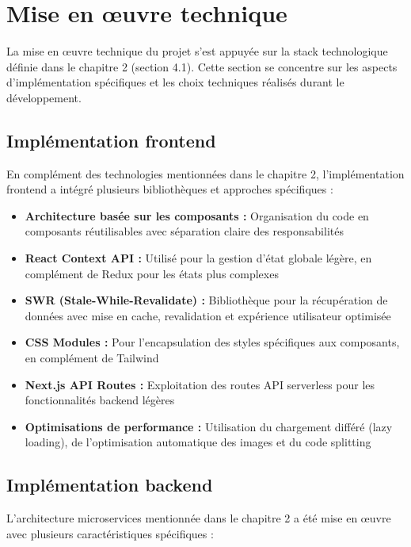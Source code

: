 \section{Mise en œuvre technique}

La mise en œuvre technique du projet s'est appuyée sur la stack technologique définie dans le chapitre 2 (section 4.1). Cette section se concentre sur les aspects d'implémentation spécifiques et les choix techniques réalisés durant le développement.

\subsection{Implémentation frontend}

En complément des technologies mentionnées dans le chapitre 2, l'implémentation frontend a intégré plusieurs bibliothèques et approches spécifiques :

\begin{itemize}
  \item \textbf{Architecture basée sur les composants :} Organisation du code en composants réutilisables avec séparation claire des responsabilités
  \item \textbf{React Context API :} Utilisé pour la gestion d'état globale légère, en complément de Redux pour les états plus complexes
  \item \textbf{SWR (Stale-While-Revalidate) :} Bibliothèque pour la récupération de données avec mise en cache, revalidation et expérience utilisateur optimisée
  \item \textbf{CSS Modules :} Pour l'encapsulation des styles spécifiques aux composants, en complément de Tailwind
  \item \textbf{Next.js API Routes :} Exploitation des routes API serverless pour les fonctionnalités backend légères
  \item \textbf{Optimisations de performance :} Utilisation du chargement différé (lazy loading), de l'optimisation automatique des images et du code splitting
\end{itemize}

\subsection{Implémentation backend}

L'architecture microservices mentionnée dans le chapitre 2 a été mise en œuvre avec plusieurs caractéristiques spécifiques :

